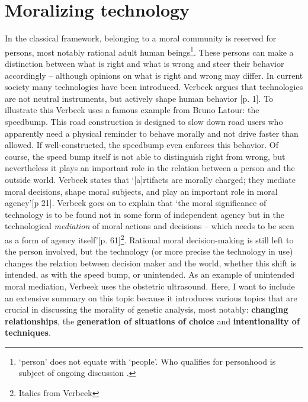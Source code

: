 \section{Moralizing technology} \label{Moralizing}
In the classical framework, belonging to a moral community is reserved for persons, most notably rational adult human beings\footnote{‘person’ does not equate with ‘people’. Who qualifies for personhood is subject of ongoing discussion \cite{White_2013}.}. 
These persons can make a distinction between what is right and what is wrong and steer their behavior accordingly – although opinions on what is right and wrong may differ. 
In current society many technologies have been introduced. Verbeek argues that technologies are not neutral instruments, but actively shape human behavior \cite{Verbeek_2011}[p. 1].
To illustrate this Verbeek uses a famous example from Bruno Latour: the speedbump. 
This road construction is designed to slow down road users who apparently need a physical reminder to behave morally and not drive faster than allowed. 
If well-constructed, the speedbump even enforces this behavior. Of course, the speed bump itself is not able to distinguish right from wrong, but nevertheless it plays an important role in the relation between a person and the outside world. 
Verbeek states that ‘[a]rtifacts are morally charged; they mediate moral decisions, shape moral subjects, and play an important role in moral agency’[p 21]. 
Verbeek goes on to explain that ‘the moral significance of technology is to be found not in some form of independent agency but in the technological \textsl{mediation} of moral actions and decisions – which needs to be seen as a form of agency itself’[p. 61]\footnote{Italics from Verbeek}. 
Rational moral decision-making is still left to the person involved, but the technology (or more precise the technology in use) changes the relation between decision maker and the world, whether this shift is intended, as with the speed bump, or unintended. 
As an example of unintended moral mediation, Verbeek uses the obstetric ultrasound. 
Here, I want to include an extensive summary on this topic because it introduces various topics that are crucial in discussing the morality of genetic analysis, most notably: \textbf{changing relationships}, the \textbf{generation of situations of choice} and \textbf{intentionality of techniques}.

